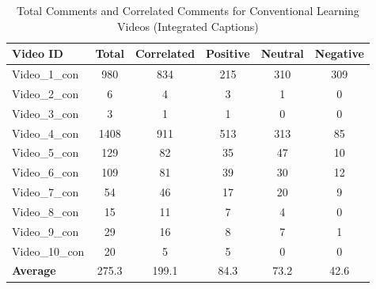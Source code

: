 \documentclass[12pt]{article}
\begin{document}
\begin{table}[H] %
    \centering
    \caption{Total Comments and Correlated Comments for Conventional Learning Videos (Integrated Captions)}
    \label{tab:em_integrated}
    \begin{tabular}{lccccc} 
        \toprule
        \textbf{Video ID} & \textbf{Total} & \textbf{Correlated} & \textbf{Positive} & \textbf{Neutral} & \textbf{Negative} \\
        \midrule
        Video\_1\_con  & 980  & 834  & 215 & 310 & 309 \\
        Video\_2\_con  & 6    & 4    & 3   & 1   & 0   \\
        Video\_3\_con  & 3    & 1    & 1   & 0   & 0   \\
        Video\_4\_con  & 1408 & 911  & 513 & 313 & 85  \\
        Video\_5\_con  & 129  & 82   & 35  & 47  & 10  \\
        Video\_6\_con  & 109  & 81   & 39  & 30  & 12  \\
        Video\_7\_con  & 54   & 46   & 17  & 20  & 9   \\ 
        Video\_8\_con  & 15   & 11   & 7   & 4   & 0   \\
        Video\_9\_con  & 29   & 16   & 8   & 7   & 1   \\
        Video\_10\_con & 20   & 5    & 5   & 0   & 0   \\
        \textbf{Average} & 275.3 & 199.1 & 84.3 & 73.2 & 42.6 \\
        \bottomrule
    \end{tabular}
\end{table}
\end{document}
